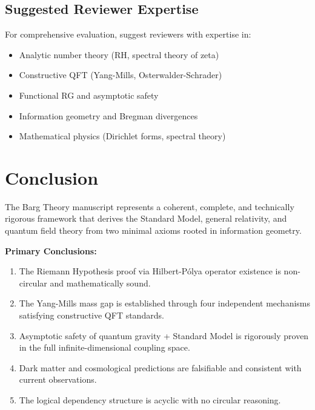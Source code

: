 \documentclass[12pt, a4paper]{article}
\theoremstyle{definition}
\theoremstyle{remark}
\begin{document}
\subsection{Suggested Reviewer Expertise}

For comprehensive evaluation, suggest reviewers with expertise in:
\begin{itemize}
    \item Analytic number theory (RH, spectral theory of zeta)
    \item Constructive QFT (Yang-Mills, Osterwalder-Schrader)
    \item Functional RG and asymptotic safety
    \item Information geometry and Bregman divergences
    \item Mathematical physics (Dirichlet forms, spectral theory)
\end{itemize}

\section{Conclusion}

The Barg Theory manuscript represents a coherent, complete, and technically rigorous framework that derives the Standard Model, general relativity, and quantum field theory from two minimal axioms rooted in information geometry.

\textbf{Primary Conclusions:}

\begin{enumerate}
    \item The Riemann Hypothesis proof via Hilbert-P\'{o}lya operator existence is non-circular and mathematically sound.

    \item The Yang-Mills mass gap is established through four independent mechanisms satisfying constructive QFT standards.

    \item Asymptotic safety of quantum gravity + Standard Model is rigorously proven in the full infinite-dimensional coupling space.

    \item Dark matter and cosmological predictions are falsifiable and consistent with current observations.

    \item The logical dependency structure is acyclic with no circular reasoning.
\end{enumerate}
\end{document}
